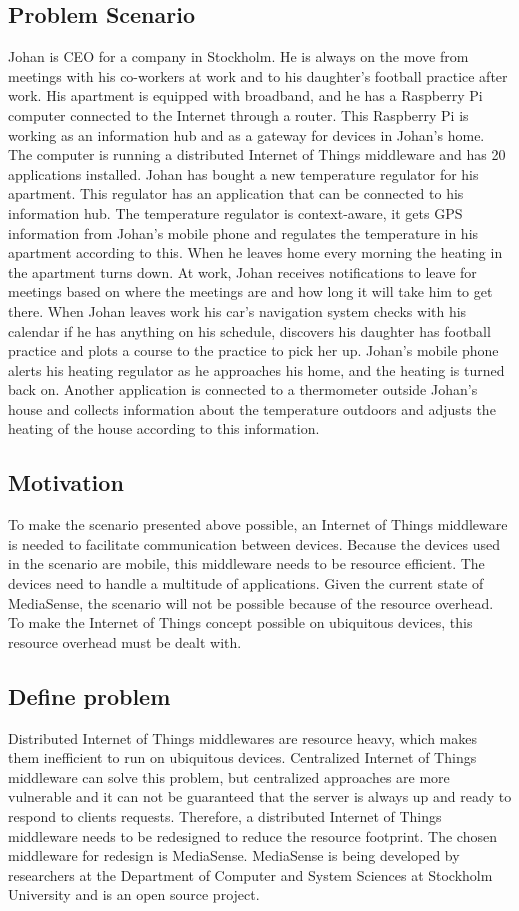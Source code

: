 \subsection{Problem Scenario}
Johan is CEO for a company in Stockholm. He is always on the move from meetings with his co-workers at work and to his daughter's football practice after work. His apartment is equipped with broadband, and he has a Raspberry Pi computer connected to the Internet through a router. This Raspberry Pi is working as an information hub and as a gateway for devices in Johan's home. The computer is running a distributed Internet of Things middleware and has 20 applications installed. Johan has bought a new temperature regulator for his apartment. This regulator has an application that can be connected to his information hub. The temperature regulator is context-aware, it gets GPS information from Johan's mobile phone and regulates the temperature in his apartment according to this. When he leaves home every morning the heating in the apartment turns down. At work, Johan receives notifications to leave for meetings based on where the meetings are and how long it will take him to get there. When Johan leaves work his car's navigation system checks with his calendar if he has anything on his schedule, discovers his daughter has football practice and plots a course to the practice to pick her up. Johan's mobile phone alerts his heating regulator as he approaches his home, and the heating is turned back on. Another application is connected to a thermometer outside Johan's house and collects information about the temperature outdoors and adjusts the heating of the house according to this information.

\subsection{Motivation}
To make the scenario presented above possible, an Internet of Things middleware is needed to facilitate communication between devices. Because the devices used in the scenario are mobile, this middleware needs to be resource efficient. The devices need to handle a multitude of applications. Given the current state of MediaSense, the scenario will not be possible because of the resource overhead. To make the Internet of Things concept possible on ubiquitous devices, this resource overhead must be dealt with.

\subsection{Define problem}
Distributed Internet of Things middlewares are resource heavy, which makes them inefficient to run on ubiquitous devices. Centralized Internet of Things middleware can solve this problem, but centralized approaches are more vulnerable and it can not be guaranteed that the server is always up and ready to respond to clients requests. Therefore, a distributed Internet of Things middleware needs to be redesigned to reduce the resource footprint. The chosen middleware for redesign is MediaSense. MediaSense is being developed by researchers at the Department of Computer and System Sciences at Stockholm University and is an open source project. 

